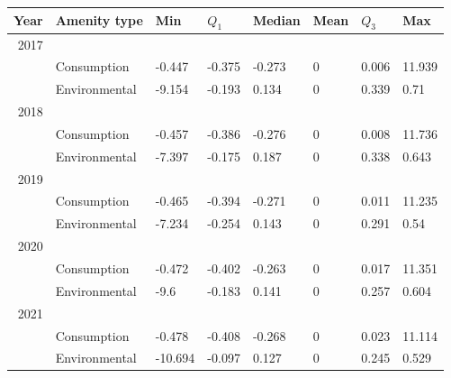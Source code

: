\begin{tabular}{rlllllll}
\hline\hline
    \multicolumn{1}{l}{Year} & Amenity type & Min   & $Q_{1}$   & Median & Mean  & $Q_{3}$   & Max \\
    \hline
    2017  &       &       &       &       &       &       &  \\
          & Consumption & -0.447 & -0.375 & -0.273 & 0     & 0.006 & 11.939 \\
          & Environmental & -9.154 & -0.193 & 0.134 & 0     & 0.339 & 0.71 \\
    2018  &       &       &       &       &       &       &  \\
          & Consumption & -0.457 & -0.386 & -0.276 & 0     & 0.008 & 11.736 \\
          & Environmental & -7.397 & -0.175 & 0.187 & 0     & 0.338 & 0.643 \\
    2019  &       &       &       &       &       &       &  \\
          & Consumption & -0.465 & -0.394 & -0.271 & 0     & 0.011 & 11.235 \\
          & Environmental & -7.234 & -0.254 & 0.143 & 0     & 0.291 & 0.54 \\
    2020  &       &       &       &       &       &       &  \\
          & Consumption & -0.472 & -0.402 & -0.263 & 0     & 0.017 & 11.351 \\
          & Environmental & -9.6  & -0.183 & 0.141 & 0     & 0.257 & 0.604 \\
    2021  &       &       &       &       &       &       &  \\
          & Consumption & -0.478 & -0.408 & -0.268 & 0     & 0.023 & 11.114 \\
          & Environmental & -10.694 & -0.097 & 0.127 & 0     & 0.245 & 0.529 \\
\hline\hline
\end{tabular}
